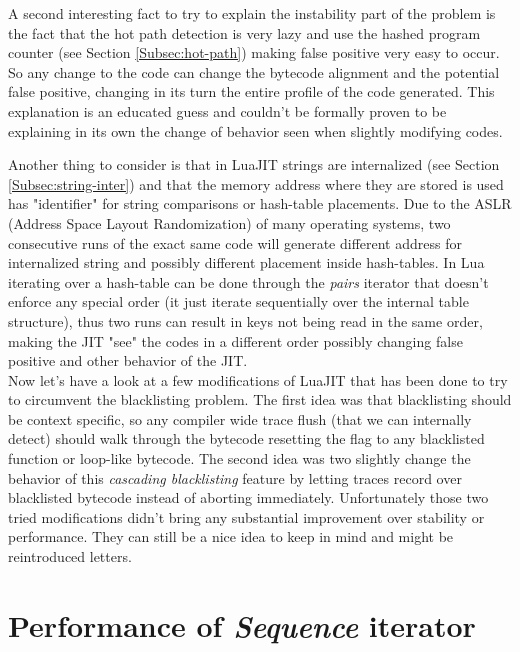 A second interesting fact to try to explain the instability part of the problem
is the fact that the hot path detection is very lazy and use the hashed program
counter (see Section \ref{Subsec:hot-path}) making false positive very easy to
occur. So any change to the code can change the bytecode alignment and the
potential false positive, changing in its turn the entire profile of the code
generated. This explanation is an educated guess and couldn't be formally proven
to be explaining in its own the change of behavior seen when slightly modifying
codes.

Another thing to consider is that in LuaJIT strings are internalized (see
Section \ref{Subsec:string-inter}) and that the memory address where they are
stored is used has "identifier" for string comparisons or hash-table placements.
Due to the ASLR (Address Space Layout Randomization) of many operating systems,
two consecutive runs of the exact same code will generate different address for
internalized string and possibly different placement inside hash-tables. In Lua
iterating over a hash-table can be done through the \emph{pairs} iterator that
doesn't enforce any special order (it just iterate sequentially over the internal
table structure), thus two runs can result in keys not being read in the same order,
making the JIT "see" the codes in a different order possibly changing false positive
and other behavior of the JIT.\\

Now let's have a look at a few modifications of LuaJIT that has been done to try
to circumvent the blacklisting problem. The first idea was that blacklisting
should be context specific, so any compiler wide trace flush (that we can
internally detect) should walk through the bytecode resetting the flag to any
blacklisted function or loop-like bytecode. The second idea was two slightly
change the behavior of this \emph{cascading blacklisting} feature by letting
traces record over blacklisted bytecode instead of aborting immediately.
Unfortunately those two tried modifications didn't bring any substantial
improvement over stability or performance. They can still be a nice idea to keep
in mind and might be reintroduced letters.


\section{Performance of \emph{Sequence} iterator}
\label{Sec:MO-perf-iter}

